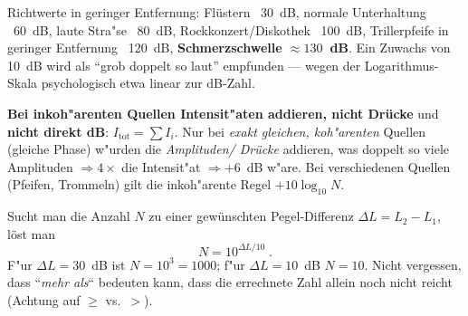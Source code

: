\begin{werkzeugkasten}
Richtwerte in geringer Entfernung: Flüstern ~30~dB, normale Unterhaltung
~60~dB, laute Stra"se ~80~dB, Rockkonzert/Diskothek ~100~dB,
Trillerpfeife in geringer Entfernung ~120~dB, \textbf{Schmerzschwelle
$\approx130$~dB}.
Ein Zuwachs von 10~dB wird als ``grob doppelt so laut'' empfunden --- wegen
der Logarithmus-Skala psychologisch etwa linear zur dB-Zahl.
\end{werkzeugkasten}

\begin{achtung}
\textbf{Bei inkoh"arenten Quellen Intensit"aten addieren, nicht Drücke} und
\textbf{nicht direkt dB}: $I_{\text{tot}}=\sum I_i$. Nur bei \emph{exakt
gleichen, koh"arenten} Quellen (gleiche Phase) w"urden die \emph{Amplituden/
Drücke} addieren, was doppelt so viele Amplituden $\Rightarrow 4\times$ die
Intensit"at $\Rightarrow +6$~dB w"are. Bei verschiedenen Quellen (Pfeifen,
Trommeln) gilt die inkoh"arente Regel $+10\log_{10}N$.
\end{achtung}

\begin{achtung}
Sucht man die Anzahl $N$ zu einer gewünschten Pegel-Differenz
$\Delta L=L_2-L_1$, löst man
\begin{equation}
  N=10^{\Delta L/10}\;.
\end{equation}
F"ur $\Delta L=30$~dB ist $N=10^{3}=1000$; f"ur $\Delta L=10$~dB
$N=10$. Nicht vergessen, dass ``\emph{mehr als}`` bedeuten kann, dass die
errechnete Zahl allein noch nicht reicht (Achtung auf $\ge$ vs.\ $>$).
\end{achtung}
